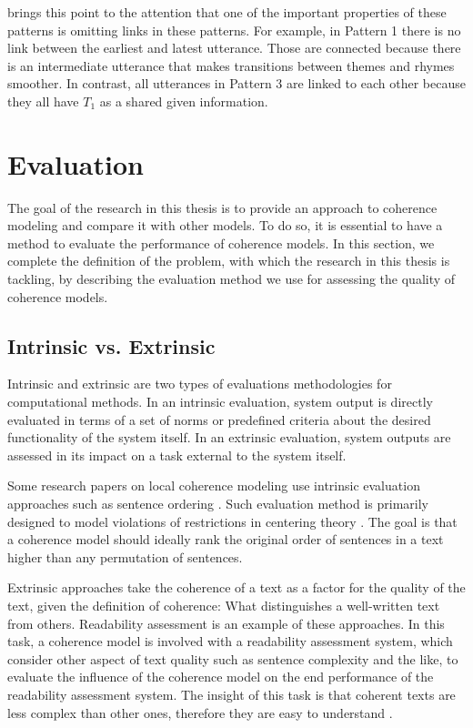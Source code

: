 brings this point to the attention that one of the important properties of these patterns is omitting links in these patterns.  
For example, in Pattern 1 there is no link between the earliest and latest utterance. 
Those are connected because there is an intermediate utterance that makes transitions between themes and rhymes smoother. 
In contrast, all utterances in Pattern 3  are linked to each other because they all have $T_1$ as a shared given information. 

\section{Evaluation}
\label{sec:coh-eval}

The goal of the research in this thesis is to provide an approach to coherence modeling and compare it with other models. 
To do so, it is essential to have a method to evaluate the performance of coherence models. 
In this section, we complete the definition of the problem, with which the research in this thesis is tackling, by describing the evaluation method we use for assessing the quality of coherence models. 

\subsection{Intrinsic vs. Extrinsic}

Intrinsic and extrinsic are two types of evaluations methodologies for computational methods.  
In an intrinsic evaluation, system output is directly evaluated in terms of a set of norms or predefined criteria about the desired functionality of the system itself. 
In an extrinsic evaluation, system outputs are assessed in its impact on a task external to the system itself. 

Some research papers on local coherence modeling use intrinsic evaluation approaches such as sentence ordering \cite{karamanis04a,barzilay04}. 
Such evaluation method \cite{karamanis04a} is primarily designed to model violations of restrictions in centering theory . 
The goal is that a coherence model should ideally rank the original order of sentences in a text higher than any permutation of sentences. 

Extrinsic approaches take the coherence of a text as a factor for the quality of the text, given the definition of coherence: What distinguishes a well-written text from others. 
Readability assessment \cite{pitler08} is an example of these approaches. 
In this task, a coherence model is involved with a readability assessment system, which consider other aspect of text quality such as sentence complexity and the like, to evaluate the influence of the coherence model on the end performance of the readability assessment system. 
The insight of this task is that coherent texts are less complex than other ones, therefore they are easy to understand \cite{pitler08}. 

